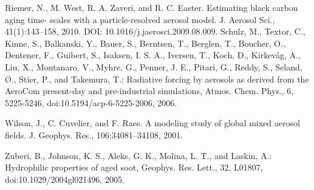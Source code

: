 \documentclass[12pt]{article}
\begin{document}
Riemer, N., M. West, R. A. Zaveri, and R. C. Easter. Estimating black carbon aging time- scales with a particle-resolved aerosol model. J. Aerosol Sci., 41(1):143–158, 2010. DOI: 10.1016/j.jaerosci.2009.08.009.
Schulz, M., Textor, C., Kinne, S., Balkanski, Y., Bauer, S., Berntsen, T., Berglen, T., Boucher, O., Dentener, F., Guibert, S., Isaksen, I. S. A., Iversen, T., Koch, D., Kirkevåg, A., Liu, X., Montanaro, V., Myhre, G., Penner, J. E., Pitari, G., Reddy, S., Seland, Ø., Stier, P., and Takemura, T.: Radiative forcing by aerosols as derived from the AeroCom present-day and pre-industrial simulations, Atmos. Chem. Phys., 6, 5225-5246, doi:10.5194/acp-6-5225-2006, 2006.

Wilson, J., C. Cuvelier, and F. Raes. A modeling study of global mixed aerosol fields. J. Geophys. Res., 106:34081–34108, 2001.

Zuberi, B., Johnson, K. S., Aleks, G. K., Molina, L. T., and Laskin, A.: Hydrophilic properties of aged soot, Geophys. Res. Lett., 32, L01807, doi:10.1029/2004gl021496, 2005.

	
\end{document}

